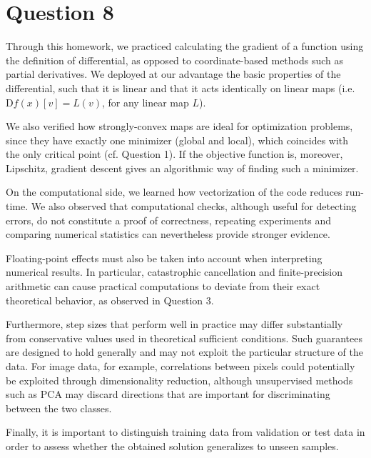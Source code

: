 \documentclass{article}
\theoremstyle{definition}
\theoremstyle{remark}
\newcommand{\D}{\mathrm D}
\begin{document}
\section*{Question 8}
Through this homework, we practiced calculating the gradient of a function using the definition of differential, as opposed to coordinate-based methods such as partial derivatives. We deployed at our advantage the basic properties of the differential, such that it is linear and that it acts identically on linear maps (i.e. $\D f(x)[v]=L(v)$, for any linear map $L$).

We also verified how strongly-convex maps are ideal for optimization problems, since they have exactly one minimizer (global and local), which coincides with the only critical point (cf. Question 1). If the objective function is, moreover, Lipschitz, gradient descent gives an algorithmic way of finding such a minimizer.

On the computational side, we learned how vectorization of the code reduces run-time. We also observed that computational checks, although useful for detecting errors, do not constitute a proof of correctness, repeating experiments and comparing numerical statistics can nevertheless provide stronger evidence.

Floating-point effects must also be taken into account when interpreting numerical results. In particular, catastrophic cancellation and finite-precision arithmetic can cause practical computations to deviate from their exact theoretical behavior, as observed in Question 3.

Furthermore, step sizes that perform well in practice may differ substantially from conservative values used in theoretical sufficient conditions. Such guarantees are designed to hold generally and may not exploit the particular structure of the data. For image data, for example, correlations between pixels could potentially be exploited through dimensionality reduction, although unsupervised methods such as PCA may discard directions that are important for discriminating between the two classes.

Finally, it is important to distinguish training data from validation or test data in order to assess whether the obtained solution generalizes to unseen samples.
\end{document}
